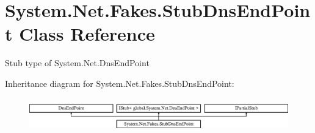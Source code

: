 \hypertarget{class_system_1_1_net_1_1_fakes_1_1_stub_dns_end_point}{\section{System.\-Net.\-Fakes.\-Stub\-Dns\-End\-Point Class Reference}
\label{class_system_1_1_net_1_1_fakes_1_1_stub_dns_end_point}
}


Stub type of System.\-Net.\-Dns\-End\-Point 


Inheritance diagram for System.\-Net.\-Fakes.\-Stub\-Dns\-End\-Point\-:\begin{figure}[H]
\begin{center}
\leavevmode
\includegraphics[height=1.499331cm]{class_system_1_1_net_1_1_fakes_1_1_stub_dns_end_point}
\end{center}
\end{figure}
